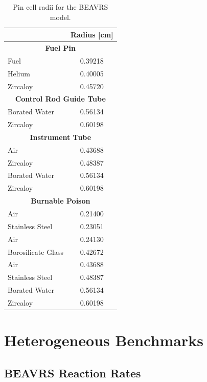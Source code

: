 \begin{appendices}
\renewcommand{\arraystretch}{0.9}
\begin{table}[h!]
  \centering
  \caption[BEAVRS pin cell radii]{Pin cell radii for the \ac{BEAVRS} model.}
  \small
  \label{table:app-pin-cell-radii} 
  \vspace{6pt}
  \begin{tabular}{l c}
  \toprule
  \rowcolor{lightgray}
  \multicolumn{1}{c}{\bf Material} &
  \multicolumn{1}{c}{\bf Radius [cm]} \\
  \midrule
  \multicolumn{2}{c}{\bf Fuel Pin} \\
  \midrule
  Fuel &  0.39218 \\
  Helium & 0.40005 \\
  Zircaloy & 0.45720 \\
  \midrule
  \multicolumn{2}{c}{\bf Control Rod Guide Tube} \\
  \midrule
  Borated Water & 0.56134 \\
  Zircaloy & 0.60198 \\
  \midrule
  \multicolumn{2}{c}{\bf Instrument Tube} \\
  \midrule
  Air & 0.43688 \\
  Zircaloy & 0.48387 \\
  Borated Water & 0.56134 \\
  Zircaloy & 0.60198 \\
  \midrule
  \multicolumn{2}{c}{\bf Burnable Poison} \\
  \midrule
  Air & 0.21400 \\
  Stainless Steel & 0.23051 \\
  Air & 0.24130 \\
  Borosilicate Glass & 0.42672 \\
  Air & 0.43688 \\
  Stainless Steel & 0.48387 \\
  Borated Water & 0.56134 \\
  Zircaloy & 0.60198 \\
  \bottomrule
\end{tabular}
\end{table}


\chapter{Heterogeneous Benchmarks}
\label{app:benchmarks}

\section{BEAVRS Reaction Rates}
\label{sec:benchmarks-beavrs-rxn-rates}


\end{appendices}
